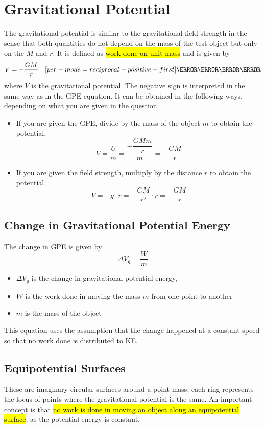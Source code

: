 \documentclass[a4paper,12pt]{article}
\let\oldsection\section
\renewcommand\section{\clearpage\oldsection}
\let\oldsi\si
\renewcommand{\si}[1]{\oldsi[per-mode=reciprocal-positive-first]{#1}}
\begin{document}
\section{Gravitational Potential}

The gravitational potential is similar to the gravitational field strength in the sense that both quantities do not depend on the mass of the test object but only on the $M$ and $r$. It is defined as \hl{work done on unit mass} and is given by
$$V = -\frac{GM}{r}\quad \si{\J\per\kilo\g}$$
where $V$ is the gravitational potential. The negative sign is interpreted in the same way as in the GPE equation.
It can be obtained in the following ways, depending on what you are given in the question
\begin{itemize}
  \item If you are given the GPE, divide by the mass of the object $m$ to obtain the potential.
        $$V = \frac{U}{m} = \frac{-\dfrac{GMm}{r}}{m} = -\frac{GM}{r}$$
  \item If you are given the field strength, multiply by the distance $r$ to obtain the potential.
        $$V = -g \cdot r = -\frac{GM}{r^2} \cdot r = -\frac{GM}{r}$$
\end{itemize}


\subsection{Change in Gravitational Potential Energy}

The change in GPE is given by
\begin{equation}\label{eq:change_GPE}
  \Delta V_g = \frac{W}{m}
\end{equation}
\begin{itemize}
  \item $\Delta V_g$ is the change in gravitational potential energy,
  \item $W$ is the work done in moving the mass $m$ from one point to another
  \item $m$ is the mass of the object
\end{itemize}
This equation uses the assumption that the change happened at a constant speed so that no work done is distributed to KE.

\subsection{Equipotential Surfaces}

These are imaginary circular surfaces around a point mass; each ring represents the locus of points where the gravitational potential is the same. An important concept is that \hl{no work is done in moving an object along an equipotential surface}, as the potential energy is constant.
\end{document}

